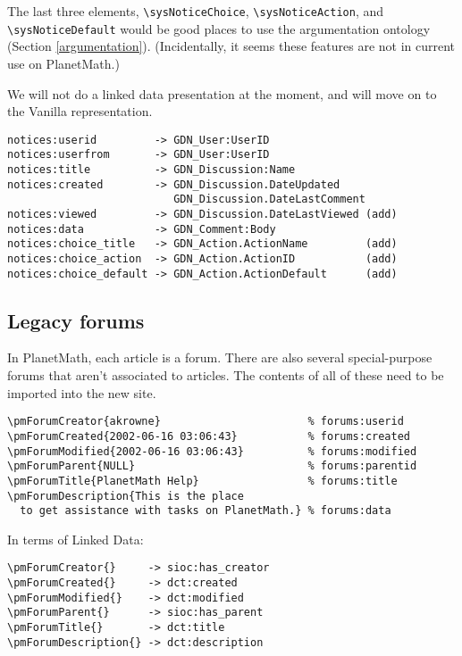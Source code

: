 \documentclass{article}
\begin{document}
The last three elements, \verb|\sysNoticeChoice|,
\verb|\sysNoticeAction|, and \verb|\sysNoticeDefault|
would be good places to use the argumentation ontology
(Section \ref{argumentation}).  (Incidentally, it seems
these features are not in current use on PlanetMath.)

We will not do a linked data presentation at the moment,
and will move on to the Vanilla representation.

\begin{verbatim}
notices:userid         -> GDN_User:UserID
notices:userfrom       -> GDN_User:UserID
notices:title          -> GDN_Discussion:Name
notices:created        -> GDN_Discussion.DateUpdated
                          GDN_Discussion.DateLastComment
notices:viewed         -> GDN_Discussion.DateLastViewed (add)
notices:data           -> GDN_Comment:Body
notices:choice_title   -> GDN_Action.ActionName         (add)
notices:choice_action  -> GDN_Action.ActionID           (add)
notices:choice_default -> GDN_Action.ActionDefault      (add)
\end{verbatim}

\subsection{Legacy forums}

In PlanetMath, each article is a forum.  There are also
several special-purpose forums that aren't associated to
articles.  The contents of all of these need to be
imported into the new site.

\begin{verbatim}
\pmForumCreator{akrowne}                       % forums:userid
\pmForumCreated{2002-06-16 03:06:43}           % forums:created
\pmForumModified{2002-06-16 03:06:43}          % forums:modified
\pmForumParent{NULL}                           % forums:parentid
\pmForumTitle{PlanetMath Help}                 % forums:title
\pmForumDescription{This is the place
  to get assistance with tasks on PlanetMath.} % forums:data
\end{verbatim}

In terms of Linked Data:

\begin{verbatim}
\pmForumCreator{}     -> sioc:has_creator
\pmForumCreated{}     -> dct:created
\pmForumModified{}    -> dct:modified
\pmForumParent{}      -> sioc:has_parent
\pmForumTitle{}       -> dct:title
\pmForumDescription{} -> dct:description
\end{verbatim}
\end{document}

